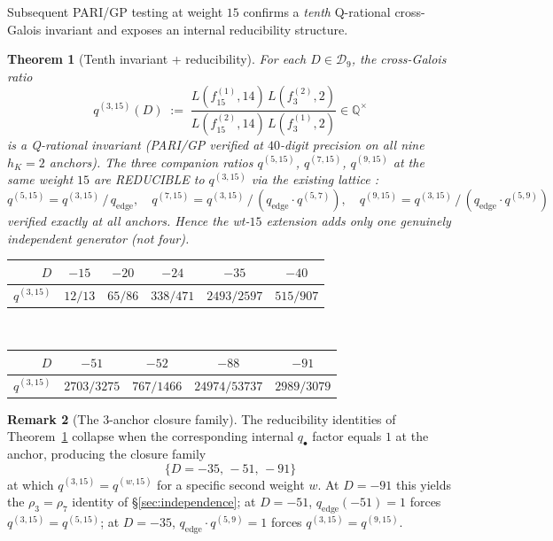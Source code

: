 \documentclass[11pt,a4paper]{amsart}
\theoremstyle{plain}
\newtheorem{theorem}{Theorem}[section]
\theoremstyle{definition}
\newtheorem{remark}[theorem]{Remark}
\newcommand{\Q}{\mathbb{Q}}
\newcommand{\eqdef}{:=}
\newcommand{\qstr}[2]{q^{(#1,#2)}}
\begin{document}
Subsequent PARI/GP testing at weight $15$ confirms a \emph{tenth}
Q-rational cross-Galois invariant and exposes an internal reducibility
structure.

\begin{theorem}[Tenth invariant + reducibility]\label{thm:ten-invariant}
For each $D \in \mathcal{D}_9$, the cross-Galois ratio
\[
\qstr{3}{15}(D) \;\eqdef\;
\frac{L(f_{15}^{(1)}, 14)\,L(f_3^{(2)}, 2)}{L(f_{15}^{(2)}, 14)\,L(f_3^{(1)}, 2)}
\in \Q^{\times}
\]
is a Q-rational invariant (PARI/GP verified at $40$-digit precision on
all nine $h_K = 2$ anchors). The three companion ratios
$\qstr{5}{15}$, $\qstr{7}{15}$, $\qstr{9}{15}$ at the same weight $15$
are REDUCIBLE to $\qstr{3}{15}$ via the existing lattice :
\[
\qstr{5}{15} = \qstr{3}{15}\,/\,q_{\mathrm{edge}}, \quad
\qstr{7}{15} = \qstr{3}{15}\,/\,(q_{\mathrm{edge}}\cdot\qstr{5}{7}), \quad
\qstr{9}{15} = \qstr{3}{15}\,/\,(q_{\mathrm{edge}}\cdot\qstr{5}{9})
\]
verified exactly at all anchors. Hence the wt-$15$ extension adds
only \emph{one} genuinely independent generator (not four).
\end{theorem}

\begin{center}
\begin{tabular}{rccccc}
\toprule
$D$ & $-15$ & $-20$ & $-24$ & $-35$ & $-40$\\
\midrule
$\qstr{3}{15}$ & $12/13$ & $65/86$ & $338/471$ & $2493/2597$ & $515/907$\\
\bottomrule
\end{tabular}\\[6pt]
\begin{tabular}{rcccc}
\toprule
$D$ & $-51$ & $-52$ & $-88$ & $-91$\\
\midrule
$\qstr{3}{15}$ & $2703/3275$ & $767/1466$ & $24974/53737$ & $2989/3079$\\
\bottomrule
\end{tabular}
\end{center}

\begin{remark}[The 3-anchor closure family]
The reducibility identities of Theorem~\ref{thm:ten-invariant}
collapse when the corresponding internal $q_{\bullet}$ factor equals
$1$ at the anchor, producing the closure family
\[
\bigl\{D = -35,\,-51,\,-91\bigr\}
\]
at which $\qstr{3}{15} = \qstr{w}{15}$ for a specific second weight $w$.
At $D=-91$ this yields the $\rho_3 = \rho_7$ identity of \S\ref{sec:independence};
at $D=-51$, $q_{\mathrm{edge}}(-51) = 1$ forces $\qstr{3}{15} = \qstr{5}{15}$;
at $D=-35$, $q_{\mathrm{edge}}\cdot\qstr{5}{9} = 1$ forces $\qstr{3}{15} = \qstr{9}{15}$.
\end{remark}
\end{document}

